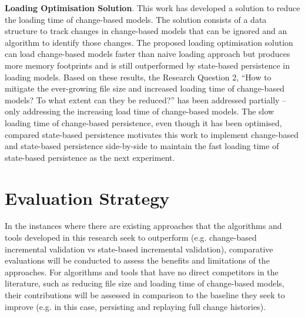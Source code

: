 \documentclass[12pt, a4paper]{report} \usepackage[titletoc]{appendix}
\begin{document}
\textbf{Loading Optimisation Solution}. This work has developed a solution to reduce the loading time of change-based models. The solution consists of a data structure to track changes in change-based models that can be ignored and an algorithm to identify those changes. The proposed loading optimisation solution can load change-based models faster than naive loading approach but produces more memory footprints and is still outperformed by state-based persistence in loading models. Based on these results, the Research Question 2, ``How to mitigate the ever-growing file size and increased loading time of change-based models? To what extent can they be reduced?'' has been addressed partially -- only addressing the increasing load time of change-based models. The slow loading time of change-based persistence, even though it has been optimised, compared state-based persistence motivates this work to implement change-based and state-based persistence side-by-side to maintain the fast loading time of state-based persistence as the next experiment.

\section{Evaluation Strategy}
\label{sec:evaluation_strategy}
In the instances where there are existing approaches that the algorithms and tools developed in this research seek to outperform (e.g. change-based incremental validation vs state-based incremental validation), comparative evaluations will be conducted to assess the benefits and limitations of the approaches. For algorithms and tools that have no direct competitors in the literature, such as reducing file size and loading time of change-based models, their contributions will be assessed in comparison to the baseline they seek to improve (e.g. in this case, persisting and replaying full change histories).  
\end{document}
